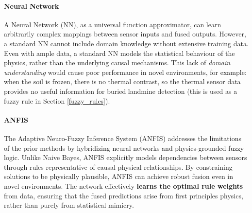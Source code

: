     \paragraph{Neural Network}

        A Neural Network (NN), as a universal function approximator, can learn arbitrarily complex mappings between sensor inputs and fused outputs. However, a standard NN cannot include domain knowledge without extensive training data. Even with ample data, a standard NN models the statistical behaviour of the physics, rather than the underlying causal mechanisms. This lack of \textit{domain understanding} would cause poor performance in novel environments, for example: when the soil is frozen, there is no thermal contrast, so the thermal sensor data provides no useful information for buried landmine detection (this is used as a fuzzy rule in Section \ref{fuzzy_rules}).


    \paragraph{ANFIS}

        The Adaptive Neuro-Fuzzy Inference System (ANFIS) \cite{jang1993anfis} addresses the limitations of the prior methods by hybridizing neural networks and physics-grounded fuzzy logic. Unlike Naive Bayes, ANFIS explicitly models dependencies between sensors through rules representative of causal physical relationships. By constraining solutions to be physically plausible, ANFIS can achieve robust fusion even in novel environments. The network effectively \textbf{learns the optimal rule weights} from data, ensuring that the fused predictions arise from first principles physics, rather than purely from statistical mimicry.


